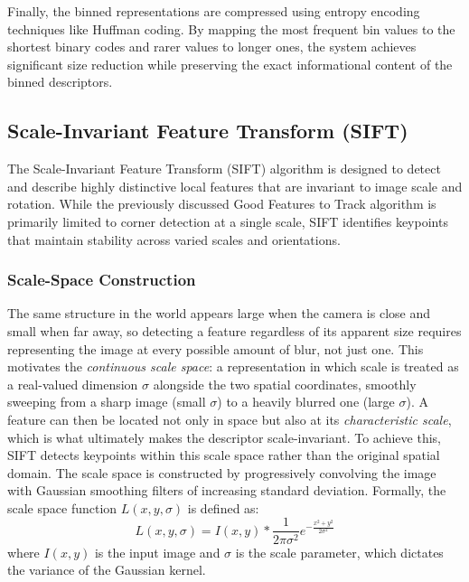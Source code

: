 Finally, the binned representations are compressed using entropy encoding techniques like Huffman coding. 
By mapping the most frequent bin values to the shortest binary codes and rarer values to longer ones, the system achieves significant size reduction while preserving the exact informational content of the binned descriptors.

\subsection{Scale-Invariant Feature Transform (SIFT)}
The Scale-Invariant Feature Transform (SIFT) algorithm is designed to detect and describe highly distinctive local features that are invariant to image scale and rotation. 
While the previously discussed Good Features to Track algorithm is primarily limited to corner detection at a single scale, SIFT identifies keypoints that maintain stability across varied scales and orientations.

\subsubsection{Scale-Space Construction}
The same structure in the world appears large when the camera is close and small when far away, so detecting a feature regardless of its apparent size requires representing the image at every possible amount of blur, not just one.
This motivates the \textit{continuous scale space}: a representation in which scale is treated as a real-valued dimension $\sigma$ alongside the two spatial coordinates, smoothly sweeping from a sharp image (small $\sigma$) to a heavily blurred one (large $\sigma$).
A feature can then be located not only in space but also at its \emph{characteristic scale}, which is what ultimately makes the descriptor scale-invariant.
To achieve this, SIFT detects keypoints within this scale space rather than the original spatial domain.
The scale space is constructed by progressively convolving the image with Gaussian smoothing filters of increasing standard deviation.
Formally, the scale space function $L(x, y, \sigma)$ is defined as:
\begin{equation}
    L(x, y, \sigma) = I(x, y) * \frac{1}{2\pi\sigma^2} e^{-\frac{x^2 + y^2}{2\sigma^2}}
\end{equation}
where $I(x, y)$ is the input image and $\sigma$ is the scale parameter, which dictates the variance of the Gaussian kernel.

